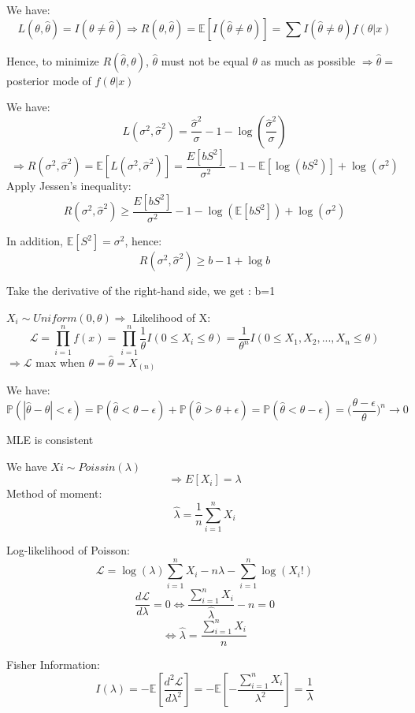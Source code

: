 \documentclass[10pt]{article}
\newenvironment{problem}[2][Problem]{\begin{trivlist}
\item[\hskip \labelsep {\bfseries #1}\hskip \labelsep {\bfseries #2.}]}{\end{trivlist}}
\begin{document}
\begin{problem}{3}
 
We have:
\[L(\theta, \hat{\theta})= I(\theta \neq \hat{\theta}) \Rightarrow R(\theta, \hat{\theta})= \mathbb{E}[I(\hat{\theta} \neq \theta)]= \sum I(\hat{\theta} \neq \theta)f(\theta | x)\]

Hence, to minimize $R(\hat{\theta}, \theta)$,  $\hat{\theta} $ must not be equal $\theta$ as much as possible $\Rightarrow \hat{\theta}=$ posterior mode of $f(\theta| x)$ 


\end{problem}

\begin{problem}{4}


We have:
\[L(\sigma ^2, \hat{\sigma} ^2)=\frac{\hat{\sigma} ^2}{\sigma} -1- \log(\frac{\hat{\sigma} ^2}{\sigma})\]
\[\Rightarrow R(\sigma ^2, \hat{\sigma} ^2)= \mathbb{E}[L(\sigma ^2, \hat{\sigma} ^2)]=\frac{E[bS^2]}{\sigma ^2}-1-\mathbb{E}[\log (bS^2)]+ \log(\sigma ^2)\]
Apply Jessen's inequality:
\[R(\sigma ^2, \hat{\sigma} ^2) \geq \frac{E[bS^2]}{\sigma ^2}-1-\log (\mathbb{E}[bS^2] )+ \log(\sigma ^2)\]

In addition, $\mathbb{E}[S^2]= \sigma ^2$, hence:
\[R(\sigma ^2, \hat{\sigma} ^2) \geq b -1 + \log b \]

Take the derivative of the right-hand side, we get : b=1


$X_i \sim Uniform(0, \theta) \Rightarrow$ Likelihood of X:
\[\mathcal{L}=\prod_{i=1}^{n}f(x)=\prod_{i=1}^{n}\frac{1}{\theta} I(0 \leq X_i \leq \theta )=\frac{1}{\theta ^n}I(0 \leq X_1, X_2,...,X_n \leq \theta)\]
$\Rightarrow \mathcal{L} $ max when $\theta= \hat{\theta}= X_{(n)}$ 

We have:
\[\mathbb{P}(|\hat{\theta}-\theta| < \epsilon) =\mathbb{P}(\hat{\theta}< \theta-\epsilon)+\mathbb{P}(\hat{\theta} > \theta + \epsilon)=\mathbb{P}(\hat{\theta} < \theta-\epsilon )=\big(\frac{\theta- \epsilon}{\theta}\big)^n \rightarrow 0\]

MLE is consistent




\end{problem}


\begin{problem}{5}
We have $Xi \sim Poissin(\lambda) $
\[ \Rightarrow E[X_i]= \lambda\]
Method of moment:
\[\hat{\lambda}= \frac{1}{n} \sum_{i=1}^{n} X_i\]

Log-likelihood of Poisson:
\[\mathcal{L}=\log(\lambda)\sum_{i=1}^{n} X_i- n\lambda-\sum_{i=1}^{n} \log(X_i!)\]
\[  \frac{d\mathcal{L}}{d\lambda}=0 \Leftrightarrow \frac{\sum_{
i=1}^{n}X_i}{\hat{\lambda}}-n =0\]
\[ \Leftrightarrow \hat{\lambda}= \frac{\sum_{i=1}^{n}X_i}{n}\]

Fisher Information:
\[I(\lambda)= -\mathbb{E}[\frac{d^2\mathcal{L}}{d\lambda^2}]=-\mathbb{E}[-\frac{\sum_{i=1}^{n} X_i}{\lambda ^2}]=\frac{1}{\lambda}\]
\end{problem}
\end{document}
